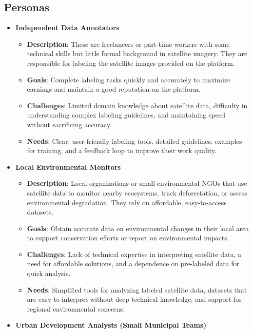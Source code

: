 \documentclass[12pt]{article}
\begin{document}
\newpage

\subsection{Personas}
\begin{itemize}
    \item \textbf{Independent Data Annotators}
    \begin{itemize}
        \item \textbf{Description}: These are freelancers or part-time workers with some technical skills but little formal background in satellite imagery. They are responsible for labeling the satellite images provided on the platform.
        \item \textbf{Goals}: Complete labeling tasks quickly and accurately to maximize earnings and maintain a good reputation on the platform.
        \item \textbf{Challenges}: Limited domain knowledge about satellite data, difficulty in understanding complex labeling guidelines, and maintaining speed without sacrificing accuracy.
        \item \textbf{Needs}: Clear, user-friendly labeling tools, detailed guidelines, examples for training, and a feedback loop to improve their work quality.
    \end{itemize}
    \item \textbf{Local Environmental Monitors}
    \begin{itemize}
        \item \textbf{Description}: Local organizations or small environmental NGOs that use satellite data to monitor nearby ecosystems, track deforestation, or assess environmental degradation. They rely on affordable, easy-to-access datasets.
        \item \textbf{Goals}: Obtain accurate data on environmental changes in their local area to support conservation efforts or report on environmental impacts.
        \item \textbf{Challenges}: Lack of technical expertise in interpreting satellite data, a need for affordable solutions, and a dependence on pre-labeled data for quick analysis.
        \item \textbf{Needs}: Simplified tools for analyzing labeled satellite data, datasets that are easy to interpret without deep technical knowledge, and support for regional environmental concerns.
    \end{itemize}
    \item \textbf{Urban Development Analysts (Small Municipal Teams)}

\end{itemize}
\end{document}
